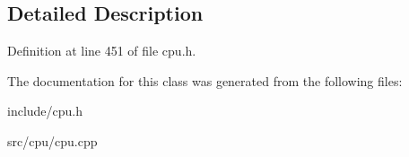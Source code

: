 \subsection{Detailed Description}


Definition at line 451 of file cpu.\-h.



The documentation for this class was generated from the following files\-:\begin{DoxyCompactItemize}
\item 
include/cpu.\-h\item 
src/cpu/cpu.\-cpp\end{DoxyCompactItemize}
